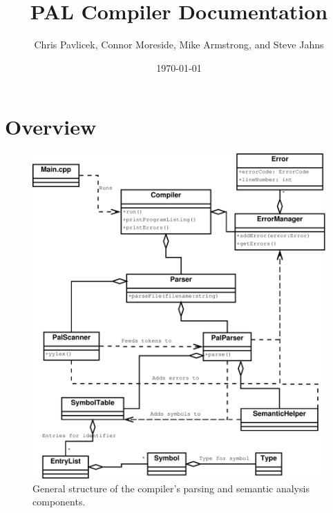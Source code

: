 \documentclass{article}
\begin{document}
\title{PAL Compiler Documentation }
\date{\today}
\author{Chris Pavlicek, Connor Moreside, Mike Armstrong, and Steve Jahns}
\maketitle

%
%

\section*{Overview}

\begin{figure}[h!]
\centering 
\includegraphics[trim=0cm 14cm 0cm 2cm, clip=true, width=19cm]{uml.pdf}
\caption{General structure of the compiler's parsing and semantic analysis components.}
\end{figure}
\end{document}
